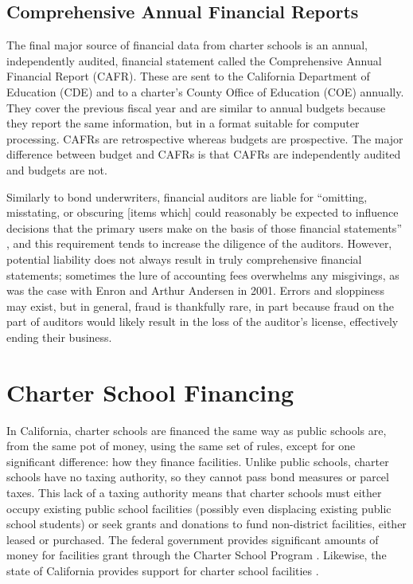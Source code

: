 \subsection{Comprehensive Annual Financial Reports}\label{sec:CAFRs}\indent%

The final major source of financial data from charter schools is an annual, independently audited, financial statement called the Comprehensive Annual Financial Report (CAFR). These are sent to the California Department of Education (CDE) and to a charter's County Office of Education (COE) annually. They cover the previous fiscal year and are similar to annual budgets because they report the same information, but in a format suitable for computer processing. CAFRs are retrospective whereas budgets are prospective. The major difference between budget and CAFRs is that CAFRs are independently audited and budgets are not. 

Similarly to bond underwriters, financial auditors are liable for ``omitting, misstating, or obscuring [items which] could reasonably be expected to influence decisions that the primary users make on the basis of those financial statements'' \parencite{Cayamanda2020}, and this requirement tends to increase the diligence of the auditors. However, potential liability does not always result in truly comprehensive financial statements; sometimes the lure of accounting fees overwhelms any misgivings, as was the case with Enron and Arthur Andersen in 2001. Errors and sloppiness may exist, but in general, fraud is thankfully rare, in part because fraud on the part of auditors would likely result in the loss of the auditor's license, effectively ending their business. 

\section{Charter School Financing}\label{sec:charter-school-financing}\indent%

In California, charter schools are financed the same way as public schools are, from the same pot of money, using the same set of rules, except for one significant difference: how they finance facilities. Unlike public schools, charter schools have no taxing authority, so they cannot pass bond measures or parcel taxes. This lack of a taxing authority means that charter schools must either occupy existing public school facilities (possibly even displacing existing public school students) or seek grants and donations to fund non-district facilities, either leased or purchased. The federal government provides significant amounts of money for facilities grant through the Charter School Program \parencite[0–10]{NCSRC2020}. Likewise, the state of California provides support for charter school facilities \parencite[114]{Aguinaldo.etal2023}.

